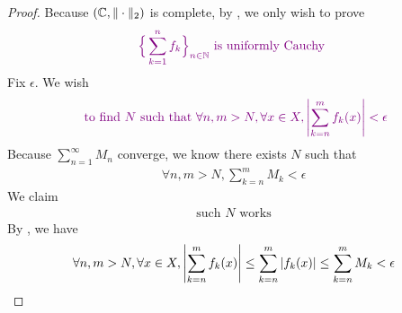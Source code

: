 \documentclass{report}
\begin{document}
\begin{proof}
Because $(\mathbb{C},\| \cdot  \|_2)$  is complete, by , we only wish to prove 
\begin{align*}
\textcolor{violet}{ \Big\{ \sum_{k=1}^n f_k \Big\}_{n\in\mathbb{N}}\text{ is uniformly Cauchy }} 
\end{align*}
Fix $\epsilon $. We wish 
 \begin{align*}
   \textcolor{violet}{\text{ to find $N$ such that  }\forall n,m>N, \forall  x\in X, \left|\sum_{k=n}^m f_k(x)\right|< \epsilon}
\end{align*}
Because $\sum_{n=1}^\infty M_n$ converge, we know there exists $N$ such that 
\begin{align*}
\forall n,m>N, \sum_{k=n}^m M_k<\epsilon 
\end{align*}
We claim
\begin{align*}
\text{ such $N$ works }
\end{align*}
By , we have 
\begin{align*}
  \forall n,m>N, \forall x \in X, \left|\sum_{k=n}^m f_k(x)\right|\leq \sum_{k=n}^m \left|f_k(x)\right|\leq \sum_{k=n}^m M_k <\epsilon 
\end{align*}
\end{proof}
\end{document}
